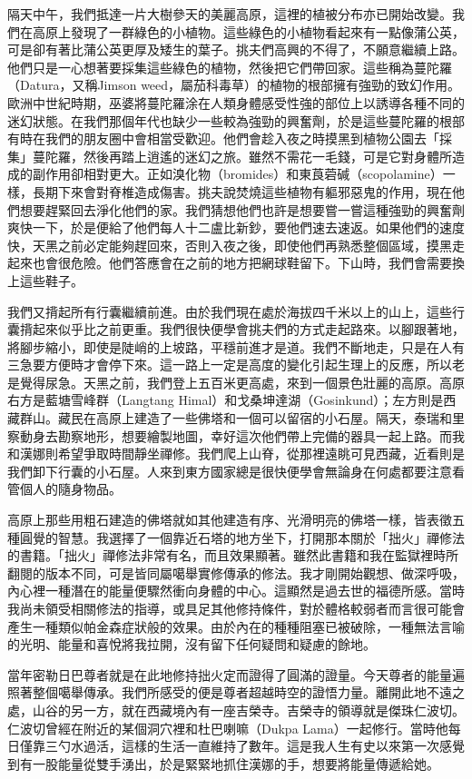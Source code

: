 隔天中午，我們抵達一片大樹參天的美麗高原，這裡的植被分布亦已開始改變。我們在高原上發現了一群綠色的小植物。這些綠色的小植物看起來有一點像蒲公英，可是卻有著比蒲公英更厚及矮生的葉子。挑夫們高興的不得了，不願意繼續上路。他們只是一心想著要採集這些綠色的植物，然後把它們帶回家。這些稱為蔓陀羅（Datura，又稱Jimson
weed，屬茄科毒草）的植物的根部擁有強勁的致幻作用。歐洲中世紀時期，巫婆將蔓陀羅涂在人類身體感受性強的部位上以誘導各種不同的迷幻狀態。在我們那個年代也缺少一些較為強勁的興奮劑，於是這些蔓陀羅的根部有時在我們的朋友圈中會相當受歡迎。他們會趁入夜之時摸黑到植物公園去「採集」蔓陀羅，然後再踏上逍遙的迷幻之旅。雖然不需花一毛錢，可是它對身體所造成的副作用卻相對更大。正如溴化物（bromides）和東莨菪碱（scopolamine）一樣，長期下來會對脊椎造成傷害。挑夫說焚燒這些植物有軀邪惡鬼的作用，現在他們想要趕緊回去淨化他們的家。我們猜想他們也許是想要嘗一嘗這種強勁的興奮劑爽快一下，於是便給了他們每人十二盧比新鈔，要他們速去速返。如果他們的速度快，天黑之前必定能夠趕回來，否則入夜之後，即使他們再熟悉整個區域，摸黑走起來也會很危險。他們答應會在之前的地方把網球鞋留下。下山時，我們會需要換上這些鞋子。

我們又揹起所有行囊繼續前進。由於我們現在處於海拔四千米以上的山上，這些行囊揹起來似乎比之前更重。我們很快便學會挑夫們的方式走起路來。以腳跟著地，將腳步縮小，即使是陡峭的上坡路，平穩前進才是道。我們不斷地走，只是在人有三急要方便時才會停下來。這一路上一定是高度的變化引起生理上的反應，所以老是覺得尿急。天黑之前，我們登上五百米更高處，來到一個景色壯麗的高原。高原右方是藍塘雪峰群（Langtang
Himal）和戈桑坤達湖（Gosinkund）；左方則是西藏群山。藏民在高原上建造了一些佛塔和一個可以留宿的小石屋。隔天，泰瑞和里察動身去勘察地形，想要繪製地圖，幸好這次他們帶上完備的器具一起上路。而我和漢娜則希望爭取時間靜坐禪修。我們爬上山脊，從那裡遠眺可見西藏，近看則是我們卸下行囊的小石屋。人來到東方國家總是很快便學會無論身在何處都要注意看管個人的隨身物品。

高原上那些用粗石建造的佛塔就如其他建造有序、光滑明亮的佛塔一樣，皆表徵五種圓覺的智慧。我選擇了一個靠近石塔的地方坐下，打開那本關於「拙火」禪修法的書籍。「拙火」禪修法非常有名，而且效果顯著。雖然此書籍和我在監獄裡時所翻閱的版本不同，可是皆同屬噶舉實修傳承的修法。我才剛開始觀想、做深呼吸，內心裡一種潛在的能量便驟然衝向身體的中心。這顯然是過去世的福德所感。當時我尚未領受相關修法的指導，或具足其他修持條件，對於體格較弱者而言很可能會產生一種類似帕金森症狀般的效果。由於內在的種種阻塞已被破除，一種無法言喻的光明、能量和喜悅將我拉開，沒有留下任何疑問和疑慮的餘地。

當年密勒日巴尊者就是在此地修持拙火定而證得了圓滿的證量。今天尊者的能量遍照著整個噶舉傳承。我們所感受的便是尊者超越時空的證悟力量。離開此地不遠之處，山谷的另一方，就在西藏境內有一座吉榮寺。吉榮寺的領導就是傑珠仁波切。仁波切曾經在附近的某個洞穴裡和杜巴喇嘛（Dukpa
Lama）一起修行。當時他每日僅靠三勺水過活，這樣的生活一直維持了數年。這是我人生有史以來第一次感覺到有一股能量從雙手湧出，於是緊緊地抓住漢娜的手，想要將能量傳遞給她。

